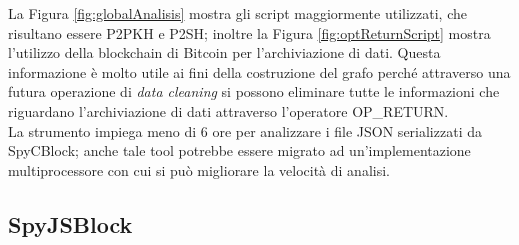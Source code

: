La Figura \ref{fig:globalAnalisis} mostra gli script maggiormente utilizzati, che risultano essere P2PKH e  P2SH; inoltre la Figura \ref{fig:optReturnScript} mostra l'utilizzo della blockchain di Bitcoin per l'archiviazione di dati. Questa informazione è molto utile ai fini della costruzione del grafo perché attraverso una futura operazione di \emph{data cleaning} si possono eliminare tutte le informazioni che riguardano l'archiviazione di dati attraverso l'operatore OP\_RETURN.\\
La strumento impiega meno di 6 ore per analizzare i file JSON serializzati da SpyCBlock; anche tale tool potrebbe essere migrato ad un'implementazione multiprocessore con cui si può migliorare la velocità di analisi.

\subsection{SpyJSBlock} \label{sec:SpyJSBlock}

